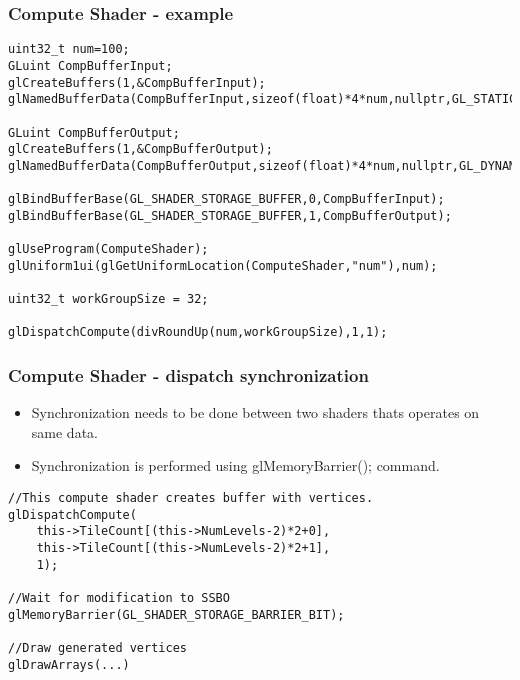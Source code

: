 \begin{frame}[fragile]
\frametitle{Compute Shader - example}
{\scriptsize
\begin{verbatim}
uint32_t num=100;
GLuint CompBufferInput;
glCreateBuffers(1,&CompBufferInput);
glNamedBufferData(CompBufferInput,sizeof(float)*4*num,nullptr,GL_STATIC_DRAW);

GLuint CompBufferOutput;
glCreateBuffers(1,&CompBufferOutput);
glNamedBufferData(CompBufferOutput,sizeof(float)*4*num,nullptr,GL_DYNAMIC_COPY);

glBindBufferBase(GL_SHADER_STORAGE_BUFFER,0,CompBufferInput);
glBindBufferBase(GL_SHADER_STORAGE_BUFFER,1,CompBufferOutput);

glUseProgram(ComputeShader);
glUniform1ui(glGetUniformLocation(ComputeShader,"num"),num);

uint32_t workGroupSize = 32;

glDispatchCompute(divRoundUp(num,workGroupSize),1,1);
\end{verbatim}
}
\end{frame}

\begin{frame}[fragile]
\frametitle{Compute Shader - dispatch synchronization}
  \begin{itemize}
    \item Synchronization needs to be done between two shaders thats operates on same data.
    \item Synchronization is performed using glMemoryBarrier(); command.
  \end{itemize}

{\scriptsize
\begin{verbatim}
//This compute shader creates buffer with vertices.
glDispatchCompute(
    this->TileCount[(this->NumLevels-2)*2+0],
    this->TileCount[(this->NumLevels-2)*2+1],
    1);

//Wait for modification to SSBO
glMemoryBarrier(GL_SHADER_STORAGE_BARRIER_BIT);

//Draw generated vertices
glDrawArrays(...)
\end{verbatim}
}
\end{frame}


